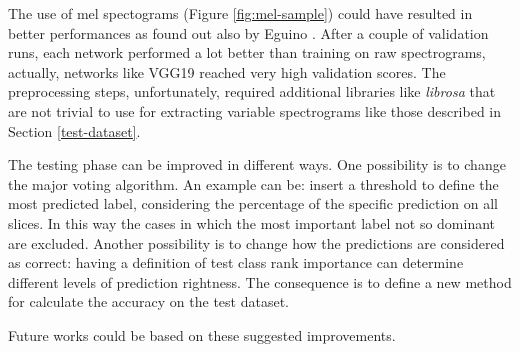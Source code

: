 \documentclass[10pt,twocolumn,letterpaper]{article}
\begin{document}
The use of mel spectograms (Figure \ref{fig:mel-sample}) could have resulted in better performances as found out also by Eguino \cite{Eguino}. After a couple of validation runs, each network performed a lot better than training on raw spectrograms, actually, networks like VGG19 reached very high validation scores. The preprocessing steps, unfortunately, required additional libraries like \textit{librosa} that are not trivial to use for extracting variable spectrograms like those described in Section \ref{test-dataset}.

The testing phase can be improved in different ways. One possibility is to change the major voting algorithm. An example can be: insert a threshold to define the most predicted label, considering the percentage of the specific prediction on all slices. In this way the cases in which the most important label not so dominant are excluded. Another possibility is to change how the predictions are considered as correct: having a definition of test class rank importance can determine different levels of prediction rightness. The consequence is to define a new method for calculate the accuracy on the test dataset.

Future works could be based on these suggested improvements.

{\small


}
\end{document}

